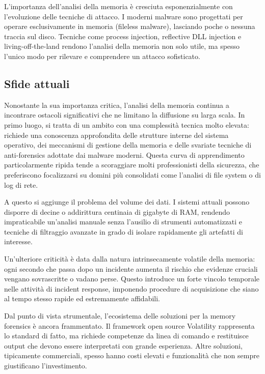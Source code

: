 L'importanza dell'analisi della memoria è cresciuta esponenzialmente con l'evoluzione delle tecniche di attacco. I moderni malware sono progettati per operare esclusivamente in memoria (fileless malware), lasciando poche o nessuna traccia sul disco. Tecniche come process injection, reflective DLL injection e living-off-the-land rendono l'analisi della memoria non solo utile, ma spesso l'unico modo per rilevare e comprendere un attacco sofisticato.

\subsection{Sfide attuali}

Nonostante la sua importanza critica, l'analisi della memoria continua a incontrare ostacoli significativi che ne limitano la diffusione su larga scala. In primo luogo, si tratta di un ambito con una complessità tecnica molto elevata: richiede una conoscenza approfondita delle strutture interne del sistema operativo, dei meccanismi di gestione della memoria e delle svariate tecniche di anti-forensics adottate dai malware moderni. Questa curva di apprendimento particolarmente ripida tende a scoraggiare molti professionisti della sicurezza, che preferiscono focalizzarsi su domini più consolidati come l’analisi di file system o di log di rete.

A questo si aggiunge il problema del volume dei dati. I sistemi attuali possono disporre di decine o addirittura centinaia di gigabyte di RAM, rendendo impraticabile un’analisi manuale senza l’ausilio di strumenti automatizzati e tecniche di filtraggio avanzate in grado di isolare rapidamente gli artefatti di interesse.

Un’ulteriore criticità è data dalla natura intrinsecamente volatile della memoria: ogni secondo che passa dopo un incidente aumenta il rischio che evidenze cruciali vengano sovrascritte o vadano perse. Questo introduce un forte vincolo temporale nelle attività di incident response, imponendo procedure di acquisizione che siano al tempo stesso rapide ed estremamente affidabili.

Dal punto di vista strumentale, l’ecosistema delle soluzioni per la memory forensics è ancora frammentato. Il framework open source Volatility rappresenta lo standard di fatto, ma richiede competenze da linea di comando e restituisce output che devono essere interpretati con grande esperienza. Altre soluzioni, tipicamente commerciali, spesso hanno costi elevati e funzionalità che non sempre giustificano l’investimento.

